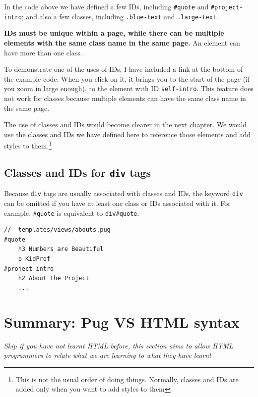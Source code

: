 In the code above we have defined a few IDs, including \texttt{\#quote} and \texttt{\#project-intro}; and also a few classes, including \texttt{.blue-text} and \texttt{.large-text}. 
\vspace{6mm}

\textbf{IDs must be unique within a page, while there can be multiple elements with the same class name in the same page.} An element can have more than one class.
\vspace{6mm}

To demonstrate one of the uses of IDs, I have included a link at the bottom of the example code. When you click on it, it brings you to the start of the page (if you zoom in large enough), to the element with ID \texttt{self-intro}. This feature does not work for classes because multiple elements can have the same class name in the same page.

The use of classes and IDs would become clearer in the \hyperref[sec:ch6]{next chapter}. We would use the classes and IDs we have defined here to reference those elements and add styles to them.\footnote{This is not the usual order of doing things. Normally, classes and IDs are added only when you want to add styles to them}

\subsection*{Classes and IDs for \texttt{div} tags}

Because \texttt{div} tags are usually associated with classes and IDs, the keyword \texttt{div} can be omitted if you have at least one class or IDs associated with it. For example, \texttt{\#quote} is equivalent to \texttt{div\#quote}.

\begin{lstlisting}[language=pug]
//- templates/views/abouts.pug
#quote
    h3 Numbers are Beautiful
    p KidProf
#project-intro
    h2 About the Project
    ...
\end{lstlisting}

\section{Summary: Pug VS HTML syntax}
\label{sec:pugvshtml}

\textit{Skip if you have not learnt HTML before, this section aims to allow HTML programmers to relate what we are learning to what they have learnt}
\vspace{6mm}

